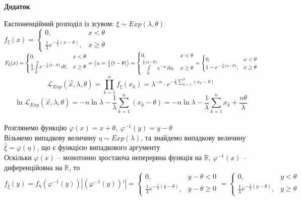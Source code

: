 \documentclass[11 pt]{article}
\begin{document}
\begin{center}
    \huge
    \textbf{Додаток}
    \label{sec:hello}
\end{center}
Експоненційний розподіл із зсувом: $\xi \sim Exp(\lambda, \theta)$ \\
$
f_{\xi}(x) = \begin{cases}
    0, & x < \theta \\ 
    \frac{1}{\lambda}e^{-\frac{1}{\lambda}(x-\theta)}, & x \ge \theta
\end{cases}
$
\\
$
F_{\xi}(x) = \begin{cases}
    0, & x < \theta \\ 
    \frac{1}{\lambda}\int_{\theta}^{x}\limits e^{-\frac{1}{\lambda}(t-\theta)} \,dt , & x \ge \theta
\end{cases}
=
\left\langle u = \frac{1}{\lambda}(t-\theta)\right\rangle =
\begin{cases}
    0, & x < \theta \\ 
    \int_{0}^{\frac{1}{\lambda}(x-\theta)}\limits e^{-u} \,du , & x \ge \theta
\end{cases}
=
\begin{cases}
    0, & x < \theta \\ 
    1-e^{-\frac{1}{\lambda}(x-\theta)} , & x \ge \theta
\end{cases}
$  
\\ 
$$ 
\mathcal{L}_{Exp}(\vec{x}, \lambda, \theta) = 
\prod_{k=1}^{n}f_{\xi}(x_k) = 
\lambda^{-n}\cdot e^{-\frac{1}{\lambda}\sum_{k=1}^{n}(x_k - \theta)}
$$
$$ 
\ln{\mathcal{L}_{Exp}(\vec{x}, \lambda, \theta)} = 
-n \ln{\lambda} - \frac{1}{\lambda}\sum_{k=1}^{n}(x_k - \theta) = 
-n \ln{\lambda} - \frac{1}{\lambda}\sum_{k=1}^{n}x_k + \frac{n \theta}{\lambda}
$$ 
\\
Розглянемо функцію $\varphi(x) = x + \theta, \ \varphi^{-1}(y) = y - \theta$ \\ 
Візьмемо випадкову величину $\eta \sim Exp(\lambda)$, та знайдемо випадкову
величину $\widehat{\xi} = \varphi(\eta)$, що є функцією випадкового аргументу \\ 
Оскільки $\varphi(x)$ -- монотонно зростаюча неперервна функція на $\mathbb{R}$,
$\varphi^{-1}(x)$ -- диференційовна на  $\mathbb{R}$, то \\ 
$$
f_{\widehat{\xi}}(y) = f_{\eta}(\varphi^{-1}(y)) |(\varphi^{-1}(y))'|
=
\begin{cases}
    0, & y - \theta < 0 \\ 
    \frac{1}{\lambda}e^{-\frac{1}{\lambda}(y-\theta)}, & y - \theta \ge 0
\end{cases}
=
\begin{cases}
    0, & y < \theta  \\ 
    \frac{1}{\lambda}e^{-\frac{1}{\lambda}(y-\theta)}, & y \ge \theta
\end{cases}
$$
\end{document}
